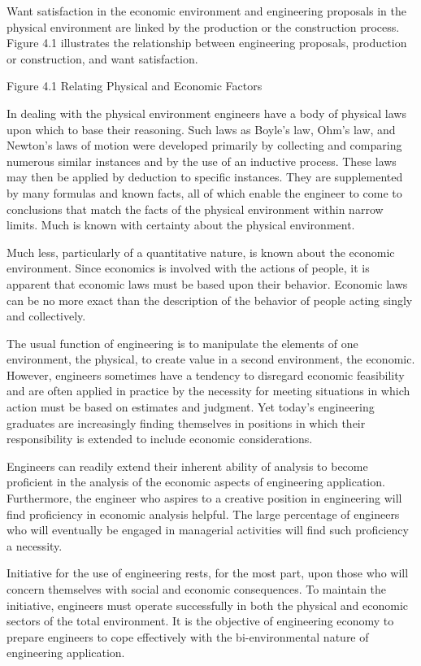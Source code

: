 Want satisfaction in the economic environment and engineering proposals in the physical environment are linked by the production or the construction process. Figure 4.1 illustrates the relationship between engineering proposals, production or construction, and want satisfaction.

Figure 4.1 Relating Physical and Economic Factors

In dealing with the physical environment engineers have a body of physical laws upon which to base their reasoning. Such laws as Boyle’s law, Ohm’s law, and Newton’s laws of motion were developed primarily by collecting and comparing numerous similar instances and by the use of an inductive process. These laws may then be applied by deduction to specific instances. They are supplemented by many formulas and known facts, all of which enable the engineer to come to conclusions that match the facts of the physical environment within narrow limits. Much is known with certainty about the physical environment.

Much less, particularly of a quantitative nature, is known about the economic environment. Since economics is involved with the actions of people, it is apparent that economic laws must be based upon their behavior. Economic laws can be no more exact than the description of the behavior of people acting singly and collectively.

The usual function of engineering is to manipulate the elements of one environment, the physical, to create value in a second environment, the economic. However, engineers sometimes have a tendency to disregard economic feasibility and are often applied in practice by the necessity for meeting situations in which action must be based on estimates and judgment. Yet today’s engineering graduates are increasingly finding themselves in positions in which their responsibility is extended to include economic considerations.

Engineers can readily extend their inherent ability of analysis to become proficient in the analysis of the economic aspects of engineering application. Furthermore, the engineer who aspires to a creative position in engineering will find proficiency in economic analysis helpful. The large percentage of engineers who will eventually be engaged in managerial activities will find such proficiency a necessity.

Initiative for the use of engineering rests, for the most part, upon those who will concern themselves with social and economic consequences. To maintain the initiative, engineers must operate successfully in both the physical and economic sectors of the total environment. It is the objective of engineering economy to prepare engineers to cope effectively with the bi-environmental nature of engineering application.

